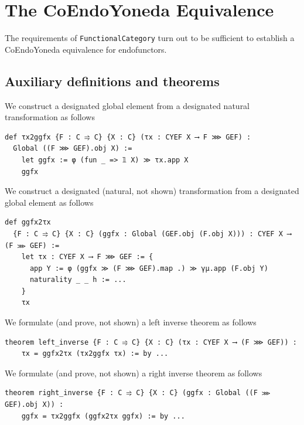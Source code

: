 \documentclass{article}
\begin{document}
\section{The CoEndoYoneda Equivalence}

The requirements of \texttt{FunctionalCategory} turn out to be sufficient to establish a
CoEndoYoneda equivalence for endofunctors.

\subsection{Auxiliary definitions and theorems}

We construct a designated global element from a designated natural transformation as follows 

\vspace{6pt}
\begin{lstlisting}[basicstyle=\tiny]
def τx2ggfx {F : C ⥤ C} {X : C} (τx : CYEF X ⟶ F ⋙ GEF) :
  Global ((F ⋙ GEF).obj X) :=
    let ggfx := φ (fun _ => 𝟙 X) ≫ τx.app X
    ggfx
\end{lstlisting}
\vspace{6pt}

We construct a designated (natural, not shown) transformation from a designated global element as
follows 

\vspace{6pt}
\begin{lstlisting}[basicstyle=\tiny]
def ggfx2τx
  {F : C ⥤ C} {X : C} (ggfx : Global (GEF.obj (F.obj X))) : CYEF X ⟶ (F ⋙ GEF) :=
    let τx : CYEF X ⟶ F ⋙ GEF := {
      app Y := φ (ggfx ≫ (F ⋙ GEF).map .) ≫ γμ.app (F.obj Y)
      naturality _ _ h := ...
    }
    τx
\end{lstlisting}
\vspace{6pt}

We formulate (and prove, not shown) a left inverse theorem as follows

\vspace{6pt}
\begin{lstlisting}[basicstyle=\tiny]
theorem left_inverse {F : C ⥤ C} {X : C} (τx : CYEF X ⟶ (F ⋙ GEF)) :
    τx = ggfx2τx (τx2ggfx τx) := by ...
\end{lstlisting}

We formulate (and prove, not shown) a right inverse theorem as follows

\vspace{6pt}
\begin{lstlisting}[basicstyle=\tiny]
theorem right_inverse {F : C ⥤ C} {X : C} (ggfx : Global ((F ⋙ GEF).obj X)) :
    ggfx = τx2ggfx (ggfx2τx ggfx) := by ...
\end{lstlisting}
\vspace{6pt}
\end{document}
